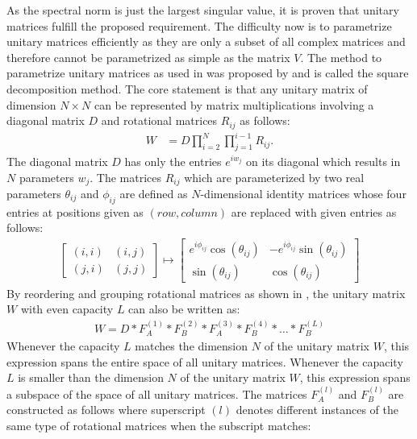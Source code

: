 \documentclass[draft,final]{vutinfth} %
\begin{document}
    As the spectral norm is just the largest singular value, it is proven that unitary matrices fulfill the proposed requirement.
    The difficulty now is to parametrize unitary matrices efficiently as they are only a subset of all complex matrices and therefore cannot be parametrized as simple as the matrix $V$.
    The method to parametrize unitary matrices as used in \cite[p. 3]{EfficientUnitaryRNNs} was proposed by \cite{UnitaryMatrixParametrization} and is called the square decomposition method.
    The core statement is that any unitary matrix of dimension $N \times N$ can be represented by matrix multiplications involving a diagonal matrix $D$ and rotational matrices $R_{ij}$ as follows:
    \begin{align}
        W &= D \prod_{i=2}^N \prod_{j=1}^{i-1} R_{ij}.
    \end{align}
    The diagonal matrix $D$ has only the entries $e^{iw_j}$ on its diagonal which results in $N$ parameters $w_j$.
    The matrices $R_{ij}$ which are parameterized by two real parameters $\theta_{ij}$ and $\phi_{ij}$ are defined as $N$-dimensional identity matrices whose four entries at positions given as $(row,column)$ are replaced with given entries as follows:
    \begin{align}
        \begin{bmatrix}
        (i,i)
            & (i,j) \\
            (j,i) & (j,j)
        \end{bmatrix} \mapsto
        \begin{bmatrix}
            e^{i\phi_{ij}}\cos (\theta_{ij})  & -e^{i\phi_{ij}}\sin (\theta_{ij}) \\
            \sin (\theta_{ij}) & \cos (\theta_{ij})
        \end{bmatrix}
    \end{align}
    By reordering and grouping rotational matrices as shown in \cite[p. 4]{EfficientUnitaryRNNs}, the unitary matrix $W$ with even capacity $L$ can also be written as:
    \begin{align}
        W = D * F_A^{(1)} * F_B^{(2)} * F_A^{(3)} * F_B^{(4)} * \ldots * F_B^{(L)}
    \end{align}
    Whenever the capacity $L$ matches the dimension $N$ of the unitary matrix $W$, this expression spans the entire space of all unitary matrices.
    Whenever the capacity $L$ is smaller than the dimension $N$ of the unitary matrix $W$, this expression spans a subspace of the space of all unitary matrices.
    The matrices $F_A^{(l)}$ and $F_B^{(l)}$ are constructed as follows where superscript $(l)$ denotes different instances of the same type of rotational matrices when the subscript matches:
\end{document}
